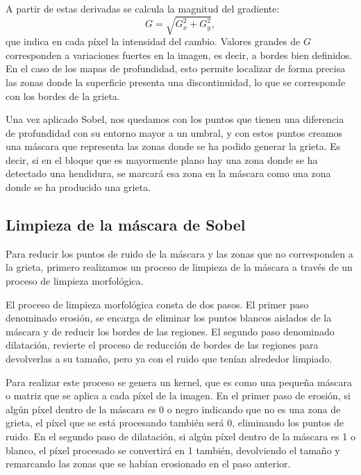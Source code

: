 A partir de estas derivadas se calcula la magnitud del gradiente:
\[
G = \sqrt{G_x^2 + G_y^2},
\]
que indica en cada píxel la intensidad del cambio. Valores grandes de \(G\) corresponden a variaciones fuertes en la imagen, es decir, a bordes bien definidos. En el caso de los mapas de profundidad, esto permite localizar de forma precisa las zonas donde la superficie presenta una discontinuidad, lo que se corresponde con los bordes de la grieta.

Una vez aplicado Sobel, nos quedamos con los puntos que tienen una diferencia de profundidad con su entorno mayor a un umbral, y con estos puntos creamos una máscara que representa las zonas donde se ha podido generar la grieta. Es decir, si en el bloque que es mayormente plano hay una zona donde se ha detectado una hendidura, se marcará esa zona en la máscara como una zona donde se ha producido una grieta.


\subsection{Limpieza de la máscara de Sobel}
Para reducir los puntos de ruido de la máscara y las zonas que no corresponden a la grieta, primero realizamos un proceso de limpieza de la máscara a través de un proceso de limpieza morfológica.

El proceso de limpieza morfológica consta de dos pasos. El primer paso denominado erosión, se encarga de eliminar los puntos blancos aislados de la máscara y de reducir los bordes de las regiones. El segundo paso denominado dilatación, revierte el proceso de reducción de bordes de las regiones para devolverlas a su tamaño, pero ya con el ruido que tenían alrededor limpiado.

Para realizar este proceso se genera un kernel, que es como una pequeña máscara o matriz que se aplica a cada píxel de la imagen. En el primer paso de erosión, si algún píxel dentro de la máscara es 0 o negro indicando que no es una zona de grieta, el píxel que se está procesando también será 0, eliminando los puntos de ruido. En el segundo paso de dilatación, si algún píxel dentro de la máscara es 1 o blanco, el píxel procesado se convertirá en 1 también, devolviendo el tamaño y remarcando las zonas que se habían erosionado en el paso anterior.

